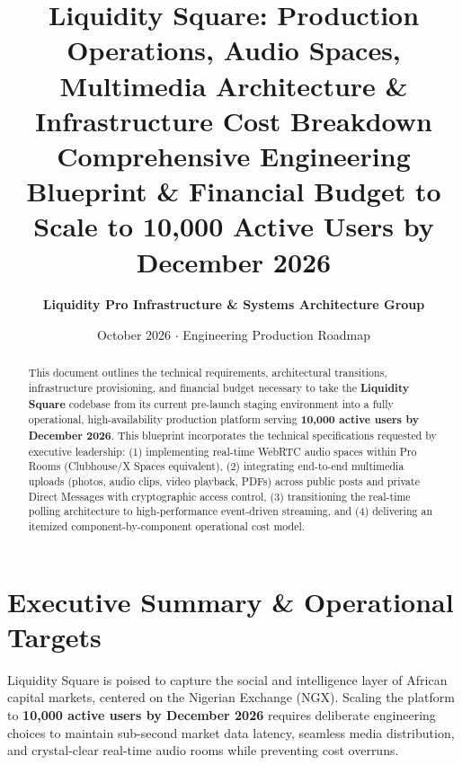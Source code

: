 \documentclass[11pt,a4paper]{article}
\title{
    \vspace{-1.5cm}
    \textbf{\Huge\sffamily Liquidity Square: Production Operations, Audio Spaces, Multimedia Architecture \& Infrastructure Cost Breakdown}\\
    \vspace{0.4cm}
    \Large\sffamily Comprehensive Engineering Blueprint \& Financial Budget to Scale to 10,000 Active Users by December 2026
}
\author{\textbf{Liquidity Pro Infrastructure \& Systems Architecture Group}}
\date{October 2026 $\cdot$ Engineering Production Roadmap}
\begin{document}
\maketitle

\begin{abstract}
\noindent This document outlines the technical requirements, architectural transitions, infrastructure provisioning, and financial budget necessary to take the \textbf{Liquidity Square} codebase from its current pre-launch staging environment into a fully operational, high-availability production platform serving \textbf{10,000 active users by December 2026}. This blueprint incorporates the technical specifications requested by executive leadership: (1) implementing real-time WebRTC audio spaces within Pro Rooms (Clubhouse/X Spaces equivalent), (2) integrating end-to-end multimedia uploads (photos, audio clips, video playback, PDFs) across public posts and private Direct Messages with cryptographic access control, (3) transitioning the real-time polling architecture to high-performance event-driven streaming, and (4) delivering an itemized component-by-component operational cost model.
\end{abstract}

\vspace{0.3cm}
\tableofcontents
\newpage

\section{Executive Summary \& Operational Targets}

Liquidity Square is poised to capture the social and intelligence layer of African capital markets, centered on the Nigerian Exchange (NGX). Scaling the platform to \textbf{10,000 active users by December 2026} requires deliberate engineering choices to maintain sub-second market data latency, seamless media distribution, and crystal-clear real-time audio rooms while preventing cost overruns.
\end{document}
